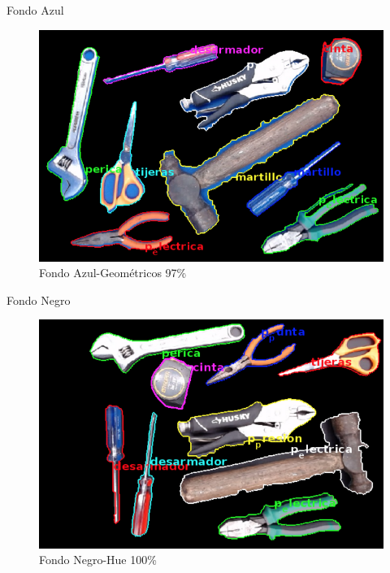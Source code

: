 \documentclass[
  24pt, %
]{beamer}
\begin{document}
\begin{frame}{Fondo Azul}
  \begin{figure}[h]
  \centering
  \includegraphics[width=\textwidth]{resultados_colores/resultado_azul_geom_0_97}
  \caption{Fondo Azul-Geométricos 97\%}
  \end{figure}
\end{frame}

\begin{frame}{Fondo Negro}
  \begin{figure}[h]
  \centering
  \includegraphics[width=\textwidth]{resultados_colores/resultado_negro_hue_1}
  \caption{Fondo Negro-Hue 100\%}
  \end{figure}
\end{frame}
\end{document}
